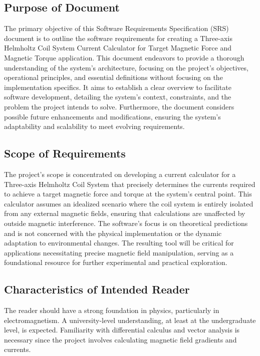 \documentclass[12pt]{article}
\begin{document}
\subsection{Purpose of Document}
{
The primary objective of this Software Requirements Specification (SRS) document is to outline the software requirements for creating a Three-axis Helmholtz Coil System Current Calculator for Target Magnetic Force and Magnetic Torque application. This document endeavors to provide a thorough understanding of the system's architecture, focusing on the project's objectives, operational principles, and essential definitions without focusing on the implementation specifics. It aims to establish a clear overview to facilitate software development, detailing the system's context, constraints, and the problem the project intends to solve. Furthermore, the document considers possible future enhancements and modifications, ensuring the system's adaptability and scalability to meet evolving requirements.
}

\subsection{Scope of Requirements} 
{
The project's scope is concentrated on developing a current calculator for a Three-axis Helmholtz Coil System that precisely determines the currents required to achieve a target magnetic force and torque at the system's central point. This calculator assumes an idealized scenario where the coil system is entirely isolated from any external magnetic fields, ensuring that calculations are unaffected by outside magnetic interference. The software's focus is on theoretical predictions and is not concerned with the physical implementation or the dynamic adaptation to environmental changes. The resulting tool will be critical for applications necessitating precise magnetic field manipulation, serving as a foundational resource for further experimental and practical exploration.
}  

\subsection{Characteristics of Intended Reader} \label{sec_IntendedReader}
{
The reader should have a strong foundation in physics, particularly in electromagnetism. A university-level understanding, at least at the undergraduate level, is expected. Familiarity with differential calculus and vector analysis is necessary since the project involves calculating magnetic field gradients and currents.

}
\end{document}
